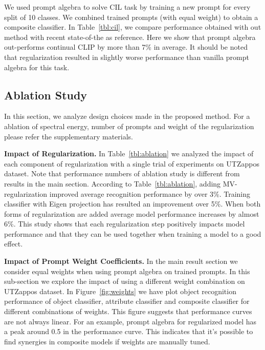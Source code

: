 \documentclass[10pt,twocolumn,letterpaper]{article}
\begin{document}
We used prompt algebra to solve CIL task by training a new prompt for  every split of 10 classes. We combined trained prompts (with equal weight) to obtain a composite classifier.  In Table~\ref{tbl:cil}, we compare performance obtained with out method with recent state-of-the as reference.  Here we show that prompt algebra out-performs continual CLIP\cite{thengane2022continualclip} by more than 7\% in average. It should be noted that regularization resulted in slightly worse performance than vanilla prompt algebra for this task. \\

\subsection{Ablation Study}

In this section, we analyze design choices made in the proposed method. For a ablation of spectral energy, number of prompts and weight of the regularization please refer the supplementary materials. 

\noindent \textbf{Impact of Regularization.} In Table~\ref{tbl:ablation} we analyzed the impact of each component of regularization with a single trial of experiments on UTZappos dataset. Note that performance numbers of ablation study is different from results in the main section. According to Table~\ref{tbl:ablation}, adding MV-regularization improved average recognition performance by over 3\%. Training classifier with Eigen projection has resulted an improvement over 5\%.  When both forms of regularization are added average model performance increases by almost 6\%. This study shows that each regularization step positively impacts model performance and that they can be used together when training a model to a good effect.

\noindent \textbf{Impact of Prompt Weight Coefficients.} In the main result section we consider equal weights when using prompt algebra on trained prompts. In this sub-section we explore the impact of using a different weight combination on UTZappos dataset. In Figure~\ref{fig:weights} we have plot object recognition performance of object classifier, attribute classifier and  composite classifier  for different combinations of weights. This figure suggests that performance curves are not always linear.  For an example, prompt algebra for regularized model has a peak around 0.5 in the performance curve. This indicates that it's possible to find synergies in composite models if weights are manually tuned. 
\end{document}
